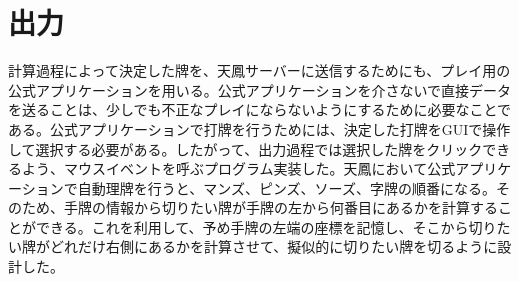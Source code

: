 \section{出力}
計算過程によって決定した牌を、天鳳サーバーに送信するためにも、プレイ用の公式アプリケーションを用いる。公式アプリケーションを介さないで直接データを送ることは、少しでも不正なプレイにならないようにするために必要なことである。公式アプリケーションで打牌を行うためには、決定した打牌をGUIで操作して選択する必要がある。したがって、出力過程では選択した牌をクリックできるよう、マウスイベントを呼ぶプログラム実装した。天鳳において公式アプリケーションで自動理牌を行うと、マンズ、ピンズ、ソーズ、字牌の順番になる。そのため、手牌の情報から切りたい牌が手牌の左から何番目にあるかを計算することができる。これを利用して、予め手牌の左端の座標を記憶し、そこから切りたい牌がどれだけ右側にあるかを計算させて、擬似的に切りたい牌を切るように設計した。


